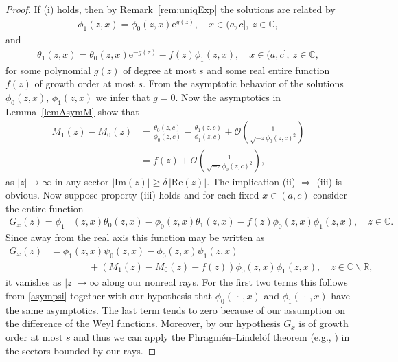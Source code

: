 \documentclass{amsart}
\numberwithin{equation}{section}
\begin{document}
\begin{proof}
If (i) holds, then by Remark~\ref{rem:uniqExp} the solutions are related by
\begin{align}\label{eqnLBMsolPHI}
 \phi_1(z,x) = \phi_0(z,x){\mathrm{e}}^{g(z)}, \quad x\in(a,c],~ z\in{{\mathbb C}},
\end{align}
and
\begin{align}\label{eqnLBMsolTHETA}
 \theta_1(z,x) = \theta_0(z,x) {\mathrm{e}}^{-g(z)} -f(z)\phi_1(z,x), \quad x\in(a,c],~z\in{{\mathbb C}},
\end{align}
 for some polynomial $g(z)$ of degree at most $s$ and some real entire function $f(z)$ of growth order at most $s$. 
 From the asymptotic behavior of the solutions $\phi_0(z,x)$, $\phi_1(z,x)$ we infer that $g=0$.
 Now the asymptotics in Lemma~\ref{lemAsymM} show that
 \begin{align*}
  M_1(z) - M_0(z) & = \frac{\theta_0(z,c)}{\phi_0(z,c)} - \frac{\theta_1(z,c)}{\phi_1(z,c)} + {\mathcal{O}}\left(\frac{1}{\sqrt{-z}\phi_0(z,c)^{2}}\right) \\
                  & = f(z) + {\mathcal{O}}\left(\frac{1}{\sqrt{-z}\phi_0(z,c)^{2}}\right),
 \end{align*}
 as $|z|\to\infty$ in any sector $|{\mathrm{Im}}(z)| \ge \delta\, |{\mathrm{Re}}(z)|$.
The implication (ii) $\Rightarrow$ (iii) is obvious.
Now suppose property (iii) holds and for each fixed $x\in(a,c)$ consider the entire function
\begin{align}\label{eqnthmbmentfun}
 G_x(z) = \phi_1&(z,x)  \theta_0(z,x) - \phi_0(z,x) \theta_1(z,x) - f(z)\phi_0(z,x) \phi_1(z,x), \quad z\in{{\mathbb C}}.
\end{align}
Since away from the real axis this function may be written as
\begin{align*}
 G_x(z) & = \phi_1(z,x) \psi_0(z,x) - \phi_0(z,x) \psi_1(z,x) \\
      & \qquad\qquad + (M_1(z)-M_0(z) - f(z)) \phi_0(z,x) \phi_1(z,x), \quad z\in{{\mathbb C}}\backslash{{\mathbb R}},
\end{align*}
it vanishes as $|z|\to\infty$ along our nonreal rays. For the first two terms this
follows from \eqref{asympsi} together with our hypothesis that $\phi_0(\,\cdot\,,x)$ and $\phi_1(\,\cdot\,,x)$
have the same asymptotics. The last term tends to zero because of our assumption on the difference of the Weyl functions.
Moreover, by our hypothesis $G_x$ is of growth order at most $s$ and thus we
can apply the Phragm\'en--Lindel\"of theorem (e.g., \cite[Section~6.1]{lev}) in the sectors bounded by our rays.

\end{proof}
\end{document}
